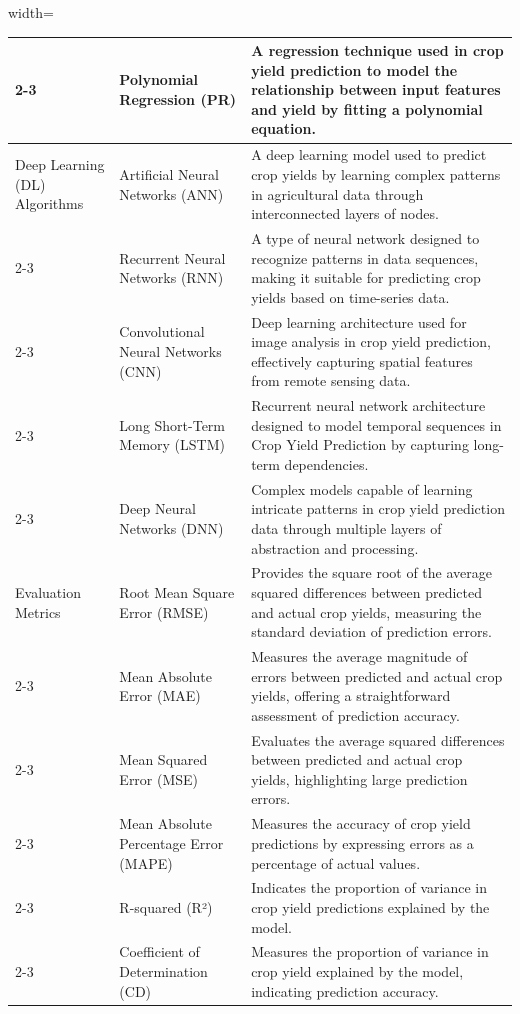 \documentclass[conference]{IEEEtran}
\begin{document}
\begin{table}[htbp]
\begin{adjustbox}{width=\textwidth}
\begin{tabular}{|p{3cm}|p{4cm}|p{7cm}|}
\cline{2-3}
& Polynomial Regression (PR) & A regression technique used in crop yield prediction to model the relationship between input features and yield by fitting a polynomial equation. \\
\hline
Deep Learning (DL) Algorithms
& Artificial Neural Networks (ANN) & A deep learning model used to predict crop yields by learning complex patterns in agricultural data through interconnected layers of nodes. \\
\cline{2-3}
& Recurrent Neural Networks (RNN) & A type of neural network designed to recognize patterns in data sequences, making it suitable for predicting crop yields based on time-series data. \\
\cline{2-3}
& Convolutional Neural Networks (CNN) & Deep learning architecture used for image analysis in crop yield prediction, effectively capturing spatial features from remote sensing data. \\
\cline{2-3}
& Long Short-Term Memory (LSTM) & Recurrent neural network architecture designed to model temporal sequences in Crop Yield Prediction by capturing long-term dependencies. \\
\cline{2-3}
& Deep Neural Networks (DNN) & Complex models capable of learning intricate patterns in crop yield prediction data through multiple layers of abstraction and processing. \\
\hline
Evaluation Metrics & Root Mean Square Error (RMSE) & Provides the square root of the average squared differences between predicted and actual crop yields, measuring the standard deviation of prediction errors. \\
\cline{2-3}
& Mean Absolute Error (MAE) & Measures the average magnitude of errors between predicted and actual crop yields, offering a straightforward assessment of prediction accuracy. \\
\cline{2-3}
& Mean Squared Error (MSE) & Evaluates the average squared differences between predicted and actual crop yields, highlighting large prediction errors. \\
\cline{2-3}
& Mean Absolute Percentage Error (MAPE) & Measures the accuracy of crop yield predictions by expressing errors as a percentage of actual values. \\
\cline{2-3}
& R-squared (R²) & Indicates the proportion of variance in crop yield predictions explained by the model. \\
\cline{2-3}
& Coefficient of Determination (CD) & Measures the proportion of variance in crop yield explained by the model, indicating prediction accuracy. \\
\hline
\end{tabular}
\end{adjustbox}
\label{table:key_terms}
\end{table}
\end{document}

